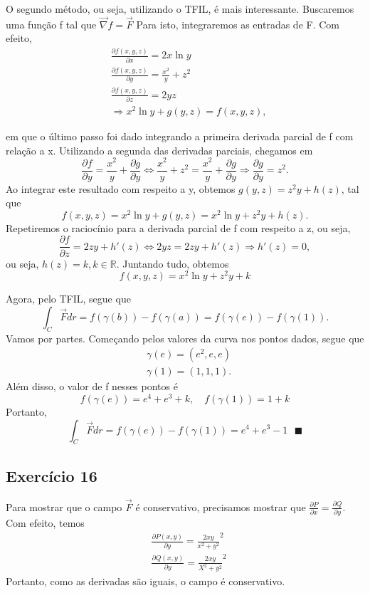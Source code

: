 \documentclass{article}
\renewcommand\qedsymbol{$\blacksquare$}
\begin{document}
O segundo m\'etodo, ou seja, utilizando o TFIL, \'e mais interessante. Buscaremos uma fun\c c\~ao f tal que $\vec{\nabla}f=\vec{F}$
Para isto, integraremos as entradas de F. Com efeito,
\begin{align*}
  &\frac{\partial{f(x, y, z)}}{\partial{x}} = 2x\ln{y} \\
  &\frac{\partial{f(x, y, z)}}{\partial{y}} = \frac{x ^{2}}{y} + z ^{2}\\
  &\frac{\partial{f(x, y, z)}}{\partial{z}} = 2yz\\
  &\Rightarrow x^2\ln{y} + g(y, z) = f(x, y, z),
\end{align*}

em que o \'ultimo passo foi dado integrando a primeira derivada parcial de f com rela\c c\~ao a x. Utilizando
a segunda das derivadas parciais, chegamos em
  $$
  \frac{\partial{f}}{\partial{y}} = \frac{x^2}{y} + \frac{\partial{g}}{\partial{y}}\Longleftrightarrow \frac{x^2}{y} + z^2 = \frac{x^2}{y} + \frac{\partial{g}}{\partial{y}}\Rightarrow \frac{\partial{g}}{\partial{y}} = z^2.
  $$
Ao integrar este resultado com respeito a y, obtemos $g(y, z) = z^{2}y + h(z)$, tal que 
  $$
  f(x, y, z) = x^{2}\ln{y} + g(y, z) = x^{2}\ln{y} + z^{2}y + h(z).
  $$
Repetiremos o racioc\'inio para a derivada parcial de f com respeito a z, ou seja, 
  $$
  \frac{\partial{f}}{\partial{z}} = 2zy + h'(z)\Longleftrightarrow 2yz = 2zy + h'(z)\Rightarrow h'(z) = 0,
  $$
ou seja, $h(z) = k, k\in\mathbb{R}.$ Juntando tudo, obtemos
  $$
  f(x, y, z) = x^{2}\ln{y} + z^{2}y + k
  $$

Agora, pelo TFIL, segue que 
  $$
  \int_{C}^{}\vec{F}dr = f(\gamma(b)) - f(\gamma(a)) = f(\gamma(e)) - f(\gamma(1)).
  $$
Vamos por partes. Come\c cando pelos valores da curva nos pontos dados, segue que 
\begin{align*}
 &\gamma(e) = (e ^{2}, e, e) \\
 &\gamma(1) = (1, 1, 1).
\end{align*}
Al\'em disso, o valor de f nesses pontos \'e
  $$
  f(\gamma(e)) = e^{4} + e^{3} + k, \quad f(\gamma(1)) = 1 + k
  $$
Portanto, 
  $$
  \int_{C}^{}\vec{F}dr = f(\gamma(e)) - f(\gamma(1)) = e^{4} + e^{3} - 1 \text{  \qedsymbol}
  $$

\subsection{Exerc\'icio 16}
Para mostrar que o campo $\vec{F}$ \'e conservativo, precisamos mostrar que $\frac{\partial{P}}{\partial{x}} = \frac{\partial{Q}}{\partial{y}}.$
Com efeito, temos 
  \begin{align*}
    &\frac{\partial{P(x, y)}}{\partial{y}} = \frac{2xy}{x^{2} + y^{2}}^2 \\
    &\frac{\partial{Q(x, y)}}{\partial{y}} = \frac{2xy}{X^{2} + y^{2}}^2
  \end{align*}
Portanto, como as derivadas s\~ao iguais, o campo \'e conservativo.
 
\end{document}

